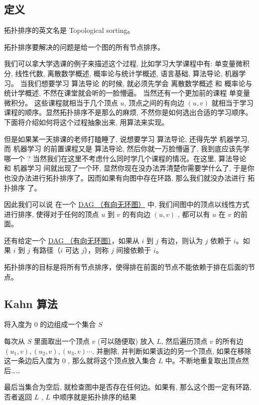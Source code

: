 
\subsection{定义}

拓扑排序的英文名是 Topological sorting。

拓扑排序要解决的问题是给一个图的所有节点排序。

我们可以拿大学选课的例子来描述这个过程, 比如学习大学课程中有: 单变量微积分, 线性代数, 离散数学概述, 概率论与统计学概述, 语言基础, 算法导论, 机器学习。 当我们想要学习 算法导论 的时候, 就必须先学会 离散数学概述 和 概率论与统计学概述, 不然在课堂就会听的一脸懵逼。 当然还有一个更加前的课程 单变量微积分。 这些课程就相当于几个顶点 $u$, 顶点之间的有向边 $(u,v)$ 就相当于学习课程的顺序。显然拓扑排序不是那么的麻烦, 不然你是如何选出合适的学习顺序。下面将介绍如何将这个过程抽象出来, 用算法来实现。

但是如果某一天排课的老师打瞌睡了, 说想要学习 算法导论, 还得先学 机器学习, 而 机器学习 的前置课程又是 算法导论, 然后你就一万脸懵逼了, 我到底应该先学哪一个 ? 当然我们在这里不考虑什么同时学几个课程的情况。在这里, 算法导论 和 机器学习 间就出现了一个环, 显然你现在没办法弄清楚你需要学什么了, 于是你也没办法进行拓扑排序了。因而如果有向图中存在环路, 那么我们就没办法进行 拓扑排序 了。

因此我们可以说 在一个 \href{/graph/dag}{DAG （有向无环图）} 中, 我们间图中的顶点以线性方式进行排序, 使得对于任何的顶点 $u$ 到 $v$ 的有向边  $(u,v)$  , 都可以有 $u$ 在 $v$ 的前面。

还有给定一个 \href{/graph/dag}{DAG （有向无环图）}，如果从 $i$ 到 $j$ 有边，则认为 $j$ 依赖于 $i$。如果 $i$ 到 $j$ 有路径（$i$ 可达 $j$），则称 $j$ 间接依赖于 $i$。

拓扑排序的目标是将所有节点排序，使得排在前面的节点不能依赖于排在后面的节点。

\subsection{Kahn 算法}

将入度为 0 的边组成一个集合 $S$ 

每次从 $S$ 里面取出一个顶点 $v$ (可以随便取) 放入  $L$, 然后遍历顶点 $v$ 的所有边$(u_1, v), (u_2, v), (u_3, v) \cdots$, 并删除, 并判断如果该边的另一个顶点, 如果在移除这一条边后入度为 0 , 那么就将这个顶点放入集合 $L$ 中。不断地重复取出顶点然后……

最后当集合为空后, 就检查图中是否存在任何边。如果有, 那么这个图一定有环路, 否者返回 $L$ , $L$ 中顺序就是拓扑排序的结果

